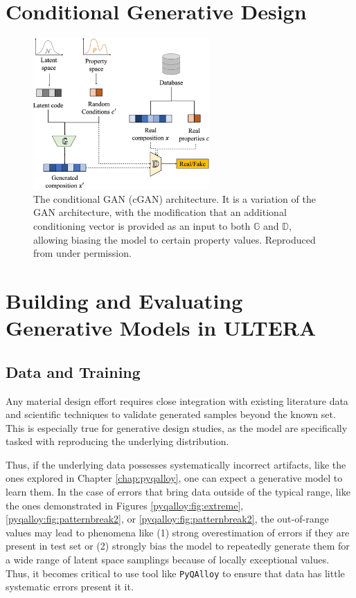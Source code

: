 \section{Conditional Generative Design} \label{inverse:sec:cgan}

\todo

\begin{figure}[H]
    \centering
    \includegraphics[width=0.6\textwidth]{inversedesign/inverse_fig2.png}
    \caption{The conditional GAN (cGAN) architecture. It is a variation of the GAN architecture, with the modification that an additional conditioning vector is provided as an input to both $\mathbb{G}$ and $\mathbb{D}$, allowing biasing the model to certain property values. Reproduced from \cite{Debnath2023ComparingAlloys} under permission.}
    \label{inverse:fig:cgan}
\end{figure}



\section{Building and Evaluating Generative Models in ULTERA} \label{inverse:sec:buildinggan}

\subsection{Data and Training} \label{inverse:ssec:datatrain}

Any material design effort requires close integration with existing literature data and scientific techniques to validate generated samples beyond the known set. This is especially true for generative design studies, as the model are specifically tasked with reproducing the underlying distribution. 

Thus, if the underlying data possesses systematically incorrect artifacts, like the ones explored in Chapter \ref{chap:pyqalloy}, one can expect a generative model to learn them. In the case of errors that bring data outside of the typical range, like the ones demonstrated in Figures \ref{pyqalloy:fig:extreme}, \ref{pyqalloy:fig:patternbreak2}, or \ref{pyqalloy:fig:patternbreak2}, the out-of-range values may lead to phenomena like (1) strong overestimation of errors if they are present in test set or (2) strongly bias the model to repeatedly generate them for a wide range of latent space samplings because of locally exceptional values. Thus, it becomes critical to use tool like \texttt{PyQAlloy} to ensure that data has little systematic errors present it it.



